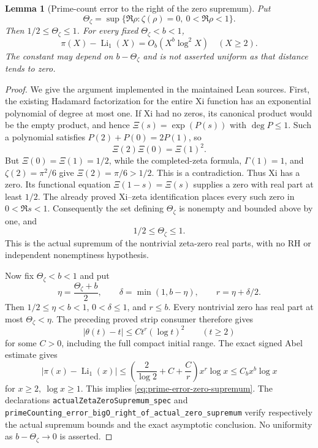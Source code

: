 \documentclass[11pt]{article}
\newtheorem{lemma}[theorem]{Lemma}
\theoremstyle{definition}
\begin{document}
\begin{lemma}[Prime-count error to the right of the zero supremum]
\label{lem:prime-error-zero-supremum}
Put
\[
 \Theta_\zeta=\sup\{\Re\rho:\zeta(\rho)=0,\ 0<\Re\rho<1\}.
\]
Then $1/2\le\Theta_\zeta\le1$. For every fixed
$\Theta_\zeta<b<1$,
\begin{equation}
 \pi(X)-\operatorname{Li}_1(X)=O_b(X^b\log^2 X)\quad(X\ge2).
 \label{eq:prime-error-zero-supremum}
\end{equation}
The constant may depend on $b-\Theta_\zeta$ and is not
asserted uniform as that distance tends to zero.
\end{lemma}

\begin{proof}
We give the argument implemented in the maintained Lean sources.
First, the existing Hadamard factorization for the entire Xi function
has an exponential polynomial of degree at most one.
If Xi had no zeros, its canonical product would be the empty product,
and hence \(\Xi(s)=\exp(P(s))\) with \(\deg P\le1\). Such a polynomial
satisfies \(P(2)+P(0)=2P(1)\), so
\[
 \Xi(2)\Xi(0)=\Xi(1)^2.
\]
But \(\Xi(0)=\Xi(1)=1/2\), while the completed-zeta formula,
\(\Gamma(1)=1\), and \(\zeta(2)=\pi^2/6\) give
\(\Xi(2)=\pi/6>1/2\). This is a contradiction.
Thus Xi has a zero. Its functional equation
\(\Xi(1-s)=\Xi(s)\) supplies a zero with real part at least \(1/2\).
The already proved Xi--zeta identification places every such zero
in \(0<\Re s<1\). Consequently the set defining \(\Theta_\zeta\)
is nonempty and bounded above by one, and
\[
 1/2\le\Theta_\zeta\le1.
\]
This is the actual supremum of the nontrivial zeta-zero real parts,
with no RH or independent nonemptiness hypothesis.

Now fix \(\Theta_\zeta<b<1\) and put
\[
 \eta=\frac{\Theta_\zeta+b}{2},\qquad
 \delta=\min(1,b-\eta),\qquad r=\eta+\delta/2.
\]
Then \(1/2\le\eta<b<1\), \(0<\delta\le1\), and \(r\le b\).
Every nontrivial zero has real part at most \(\Theta_\zeta<\eta\).
The preceding proved strip consumer therefore gives
\[
 |\theta(t)-t|\le Ct^r(\log t)^2\qquad(t\ge2)
\]
for some \(C>0\), including the full compact initial range.
The exact signed Abel estimate gives
\[
 |\pi(x)-\operatorname{Li}_1(x)|
 \le\left(\frac2{\log2}+C+\frac Cr\right)x^r\log x
 \le C_bx^b\log x
\]
for \(x\ge2,\ \log x\ge1\).
This implies \eqref{eq:prime-error-zero-supremum}.
The declarations \texttt{actualZetaZeroSupremum\_spec} and
\texttt{primeCounting\_error\_bigO\_right\_of\_actual\_zero\_supremum}
verify respectively the actual supremum bounds and the exact
asymptotic conclusion. No uniformity as \(b-\Theta_\zeta\to0\)
is asserted.


\end{proof}
\end{document}
